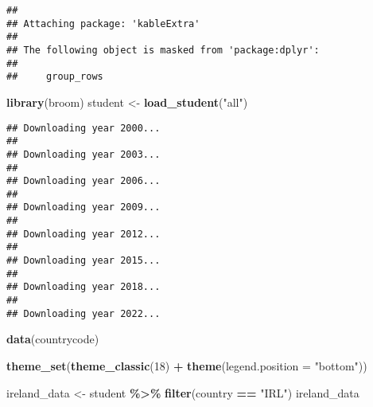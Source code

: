 \documentclass[
]{article}
\newenvironment{Shaded}{\begin{snugshade}}{\end{snugshade}}
\newcommand{\AttributeTok}[1]{\textcolor[rgb]{0.13,0.29,0.53}{#1}}
\newcommand{\DecValTok}[1]{\textcolor[rgb]{0.00,0.00,0.81}{#1}}
\newcommand{\FunctionTok}[1]{\textcolor[rgb]{0.13,0.29,0.53}{\textbf{#1}}}
\newcommand{\NormalTok}[1]{#1}
\newcommand{\OtherTok}[1]{\textcolor[rgb]{0.56,0.35,0.01}{#1}}
\newcommand{\SpecialCharTok}[1]{\textcolor[rgb]{0.81,0.36,0.00}{\textbf{#1}}}
\newcommand{\StringTok}[1]{\textcolor[rgb]{0.31,0.60,0.02}{#1}}
\begin{document}
\begin{verbatim}
## 
## Attaching package: 'kableExtra'
## 
## The following object is masked from 'package:dplyr':
## 
##     group_rows
\end{verbatim}

\begin{Shaded}
\begin{Highlighting}[]
\FunctionTok{library}\NormalTok{(broom)}
\NormalTok{student }\OtherTok{\textless{}{-}} \FunctionTok{load\_student}\NormalTok{(}\StringTok{"all"}\NormalTok{)}
\end{Highlighting}
\end{Shaded}

\begin{verbatim}
## Downloading year 2000...
## 
## Downloading year 2003...
## 
## Downloading year 2006...
## 
## Downloading year 2009...
## 
## Downloading year 2012...
## 
## Downloading year 2015...
## 
## Downloading year 2018...
## 
## Downloading year 2022...
\end{verbatim}

\begin{Shaded}
\begin{Highlighting}[]
\FunctionTok{data}\NormalTok{(countrycode)}

\FunctionTok{theme\_set}\NormalTok{(}\FunctionTok{theme\_classic}\NormalTok{(}\DecValTok{18}\NormalTok{) }\SpecialCharTok{+}
            \FunctionTok{theme}\NormalTok{(}\AttributeTok{legend.position =} \StringTok{"bottom"}\NormalTok{))}
\end{Highlighting}
\end{Shaded}

\begin{Shaded}
\begin{Highlighting}[]
\NormalTok{ireland\_data }\OtherTok{\textless{}{-}}\NormalTok{ student }\SpecialCharTok{\%\textgreater{}\%} \FunctionTok{filter}\NormalTok{(country }\SpecialCharTok{==} \StringTok{"IRL"}\NormalTok{)}
\NormalTok{ireland\_data}
\end{Highlighting}
\end{Shaded}
\end{document}
